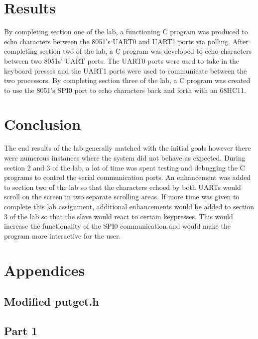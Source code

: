 \documentclass[12pt]{article}
\begin{document}
\section{Results}

By completing section one of the lab, a functioning C program was produced to echo characters between the 8051’s UART0 and UART1 ports via polling. After completing section two of the lab, a C program was developed to echo characters between two 8051s’ UART ports. The UART0 ports were used to take in the keyboard presses and the UART1 ports were used to communicate between the two processors. By completing section three of the lab, a C program was created to use the 8051’s SPI0 port to echo characters back and forth with an 68HC11. 


\section{Conclusion}

The end results of the lab generally matched with the initial goals however there were numerous instances where the system did not behave as expected. During section 2 and 3 of the lab, a lot of time was spent testing and debugging the C programs to control the serial communication ports. An enhancement was added to section two of the lab so that the characters echoed by both UARTs would scroll on the screen in two separate scrolling areas. 
If more time was given to complete this lab assignment, additional enhancements would be added to section 3 of the lab so that the slave would react to certain keypresses. This would increase the functionality of the SPI0 communication and would make the program more interactive for the user. 




\pagebreak
\section{Appendices}
\subsection{Modified putget.h}
	
\subsection{Part 1}
\end{document}
